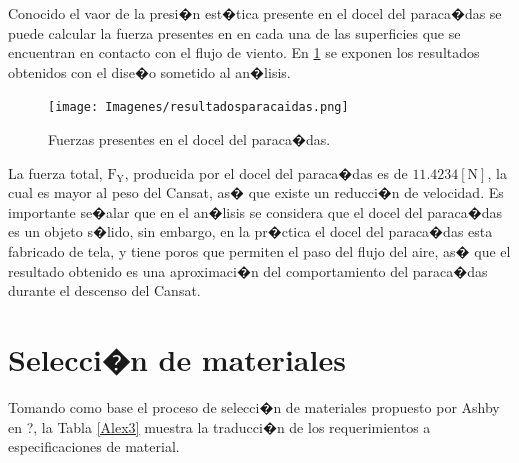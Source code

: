 \documentclass[10pt,a4paper]{book}
\begin{document}
Conocido el vaor de la presi�n est�tica presente en el docel del paraca�das se puede calcular la fuerza presentes en en cada una de las superficies que se encuentran en contacto con el flujo de viento. En \ref{img:resultadospara} se exponen los resultados obtenidos con el dise�o sometido al an�lisis. 
\begin{figure}[H]
\begin{center}
\texttt{[image: Imagenes/resultadosparacaidas.png]}
\caption{Fuerzas presentes en el docel del paraca�das. \label{img:resultadospara}}
\end{center}
\end{figure} 
La fuerza total, $\text{F}_{\text{Y}}$, producida por el docel del paraca�das es de $11{.}4234 \left[ \text{N} \right]$, la cual es mayor al peso del Cansat, as� que existe un reducci�n de velocidad. Es importante se�alar que en el an�lisis se considera que el docel del paraca�das es un objeto s�lido, sin embargo, en la pr�ctica el docel del paraca�das esta fabricado de tela, y tiene poros que permiten el paso del flujo del aire, as� que el resultado obtenido es una aproximaci�n del comportamiento del paraca�das durante el descenso del Cansat. 
\section{Selecci�n de materiales}
Tomando como base el proceso de selecci�n de materiales propuesto por Ashby en \cite{}?, la Tabla \ref{Alex3} muestra la traducci�n de los requerimientos a especificaciones de material.

\begin{table}[H]
\begin{center}
\caption{Traducci�n de requerimientos a prescripciones de materiales del SLVC.}
\label{Alex3}
\end{center}
\end{table}
\end{document}
